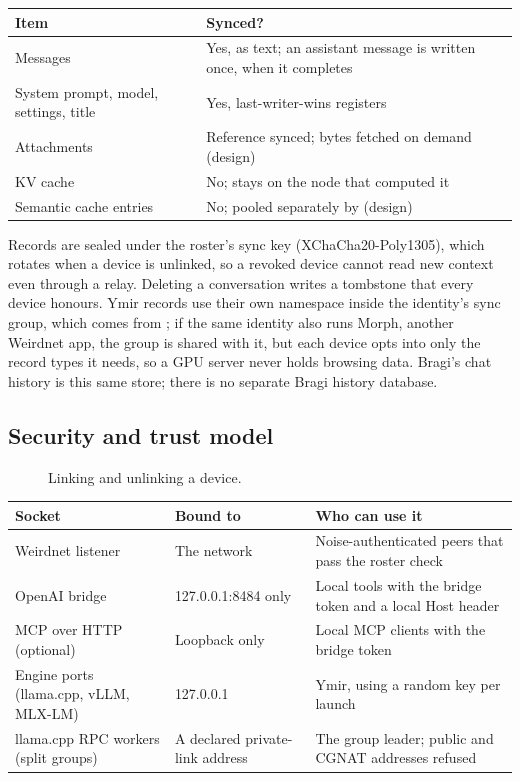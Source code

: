 \begin{table}[htbp]
\centering\small
\begin{tabularx}{\linewidth}{@{}lY@{}}
\toprule
Item & Synced? \\
\midrule
Messages & Yes, as text; an assistant message is written once, when it completes \\
System prompt, model, settings, title & Yes, last-writer-wins registers \\
Attachments & Reference synced; bytes fetched on demand (design) \\
KV cache & No; stays on the node that computed it \\
Semantic cache entries & No; pooled separately by  (design) \\
\bottomrule
\end{tabularx}
\end{table}

Records are sealed under the roster's sync key (XChaCha20-Poly1305), which rotates when a device
is unlinked, so a revoked device cannot read new context even through a relay. Deleting a
conversation writes a tombstone that every device honours. Ymir records use their own
 namespace inside the identity's sync group, which comes from ; if
the same identity also runs Morph, another Weirdnet app, the group is shared with it, but each
device opts into only the record types it needs, so a GPU server never holds browsing data.
Bragi's chat history is this same store; there is no separate Bragi history database.

\subsection{Security and trust model}\label{sec:security}

\begin{figure}[htbp]
\centering
{}
\caption{Linking and unlinking a device.}
\end{figure}

\begin{xltabular}{\linewidth}{@{}L{4.2cm}L{3.6cm}Y@{}}
\toprule
Socket & Bound to & Who can use it \\
\midrule
\endhead
Weirdnet listener & The network & Noise-authenticated peers that pass the roster check \\
OpenAI bridge & 127.0.0.1:8484 only & Local tools with the bridge token and a local Host header \\
MCP over HTTP (optional) & Loopback only & Local MCP clients with the bridge token \\
Engine ports (llama.cpp, vLLM, MLX-LM) & 127.0.0.1 & Ymir, using a random key per launch \\
llama.cpp RPC workers (split groups) & A declared private-link address & The group leader; public and CGNAT addresses refused \\
\bottomrule
\end{xltabular}

